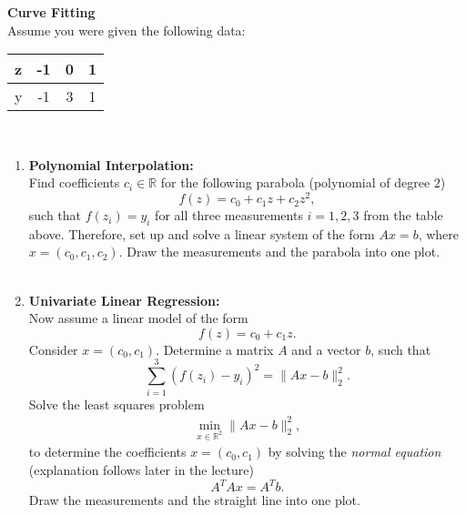 \textbf{Curve Fitting}\\
Assume you were given the following data:
\begin{center}
	\begin{tabular}{l|c c c}
	z&-1&0&1\\
	\hline
	y&-1&3&1
\end{tabular}
\end{center}

~\\
\begin{enumerate}
	\item \textbf{Polynomial Interpolation:}\\
	Find coefficients $c_i \in \mathbb{R}$ for the following parabola (polynomial of degree $2$)
	$$f(z) = c_0 + c_1z + c_2z^2,$$
	such that $f(z_i) = y_i$ for all three measurements $i=1,2,3$ from the table above. Therefore, set up and solve a linear system of the form $Ax = b$, where $x=(c_0, c_1, c_2)$. Draw the measurements and the parabola into one plot.
	~\\~\\
	\item \textbf{Univariate Linear Regression:}\\
	Now assume a linear model of the form	
	$$f(z) = c_0 + c_1z.$$
	Consider $x = (c_0, c_1)$. Determine a matrix $A$ and a vector $b$, such that
	$$\sum_{i=1}^3 (f(z_i) - y_i)^2 = \|Ax-b\|_2^2. $$
	Solve the least squares problem
		\begin{align*}
	\min \limits_{x \in \mathbb{R}^2} \|Ax-b\|_2^2,
	\end{align*}
	to determine the coefficients $x = (c_0, c_1)$ by solving the \textit{normal equation} (explanation follows later in the lecture)
	$$A^TAx = A^Tb. $$
	Draw the measurements and the straight line into one plot.
\end{enumerate}
